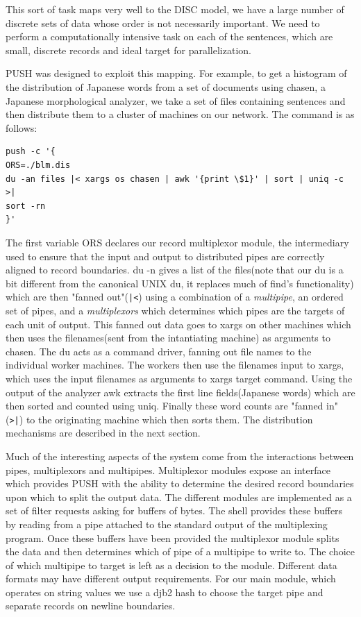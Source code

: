 \documentclass[11pt, letterpaper]{article}
\begin{document}
This sort of task maps very well to the DISC model, we have a large number of discrete sets of data whose order is not necessarily important. We need to perform a computationally intensive task on each of the sentences, which are small, discrete records and ideal target for parallelization. 

PUSH was designed to exploit this mapping. For example, to get a histogram of the distribution of Japanese words from a set of documents using chasen, a Japanese morphological analyzer, we take a set of files containing sentences and then distribute them to a cluster of machines on our network. The command is as follows:
\begin{verbatim}
push -c '{
ORS=./blm.dis
du -an files |< xargs os chasen | awk '{print \$1}' | sort | uniq -c >|
sort -rn
}'
\end{verbatim}

The first variable ORS declares our record multiplexor module, the intermediary used to ensure that the input and output to distributed pipes are correctly aligned to record boundaries. du -n gives a list of the files(note that our du is a bit different from the canonical UNIX du, it replaces much of find's functionality) which are then "fanned out"(\verb!|<!) using a combination of a \emph{multipipe}, an ordered set of pipes, and a \emph{multiplexors} which determines which pipes are the targets of each unit of output.  This fanned out data goes to xargs\cite{xargsman} on other machines which then uses the filenames(sent from the intantiating machine) as arguments to chasen. The du acts as a command driver, fanning out file names to the individual worker machines. The workers then use the filenames input to xargs, which uses the input filenames as arguments to xargs target command. Using the output of the analyzer awk extracts the first line fields(Japanese words) which are then sorted and counted using uniq.  Finally these word counts are "fanned in"(\verb!>|!) to the originating machine which then sorts them. The distribution mechanisms are described in the next section.

Much of the interesting aspects of the system come from the interactions between pipes, multiplexors and multipipes.
Multiplexor modules expose an interface which provides PUSH with the ability to determine the desired record boundaries upon which to split the output data. The different modules are implemented as a set of filter requests asking for buffers of bytes. The shell provides these buffers by reading from a pipe attached to the standard output of the multiplexing program. Once these buffers have been provided the multiplexor module splits the data and then determines which of pipe of a multipipe to write to. The choice of which multipipe to target is left as a decision to the module. Different data formats may have different output requirements. For our main module, which operates on string values we use a djb2 hash to choose the target pipe and separate records on newline boundaries.
\end{document}
